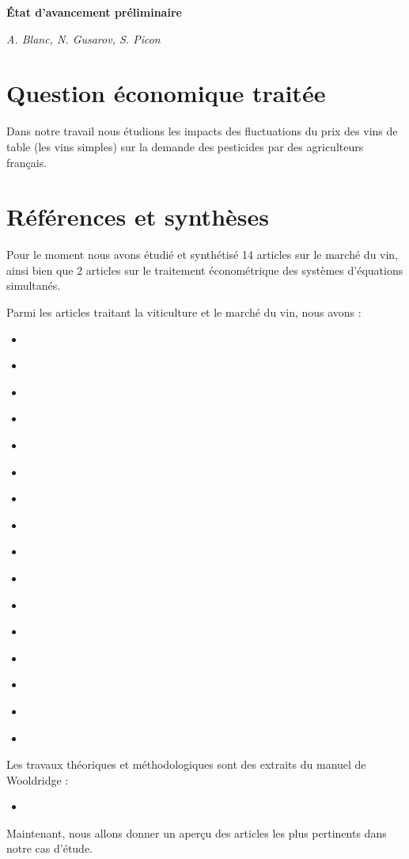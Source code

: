 \documentclass[11pt, a4paper]{article}
\begin{document}
\begin{center}
    \Large\textbf{État d'avancement préliminaire}
    \par
    \large\textit{A. Blanc, N. Gusarov, S. Picon}
\end{center}


\section*{Question économique traitée}
Dans notre travail nous étudions les impacts des fluctuations du prix des vins de table (les vins simples) sur la demande des pesticides par des agriculteurs français.

\section*{Références et synthèses}
Pour le moment nous avons étudié et synthétisé 14 articles sur le marché du vin, ainsi bien que 2 articles sur le traitement économétrique des systèmes d'équations simultanés. 
\par
Parmi les articles traitant la viticulture et le marché du vin, nous avons :
\begin{itemize}
    \item \cite{rebelo2019}
    \item \cite{anderson2018s}
    \item \cite{bazen2018}
    \item \cite{garcia2016}
    \item \cite{cembalo2014}
    \item \cite{outreville2010}
    \item \cite{benfratello2009}
    \item \cite{davis2008}
    \item \cite{christophe2008}
    \item \cite{costanigro2007}
    \item \cite{steiner2004}
    \item \cite{soler2002}
    \item \cite{giraud2001}
    \item \cite{gergaud1998}
    \item \cite{labys1976}
    \item \cite{daillens1962}
\end{itemize}
Les travaux théoriques et méthodologiques sont des extraits du manuel de Wooldridge :
\begin{itemize}
    \item \cite{wooldridge_panel}
\end{itemize}
\par
Maintenant, nous allons donner un aperçu des articles les plus pertinents dans notre cas d'étude.
\end{document}
